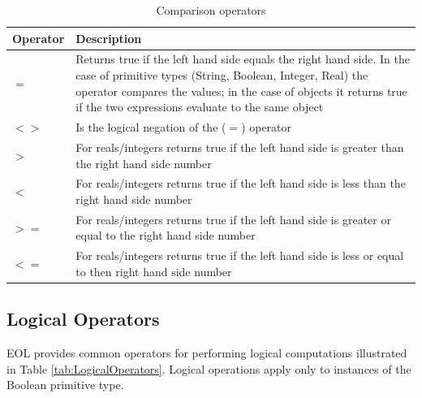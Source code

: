 \begin{longtabu} {|p{3.5cm}|X|}
			
			\caption{Comparison operators}
			\label{tab:ComparisonOperators}\\
			
			\hline
							
			\textbf{Operator} & \textbf{Description} \\\hline

			$=$ & Returns true if the left hand side equals the right hand side. In the case of primitive types (String, Boolean, Integer, Real) the operator compares the values; in the case of objects it returns true if the two expressions evaluate to the same object \\\hline
			
			$<>$ & Is the logical negation of the ($=$) operator \\\hline
				
			$>$ & For reals/integers returns true if the left hand side is greater than the right hand side number \\\hline
			
			$<$ & For reals/integers returns true if the left hand side is less than the right hand side number \\\hline
			
			$>=$ & For reals/integers returns true if the left hand side is greater or equal to the right hand side number \\\hline
			
			$<=$ & For reals/integers returns true if the left hand side is less or equal to then right hand side number \\\hline
		
\end{longtabu}

\subsection{Logical Operators}

EOL provides common operators for performing logical computations illustrated in Table \ref{tab:LogicalOperators}. Logical operations apply only to instances of the Boolean primitive type.


